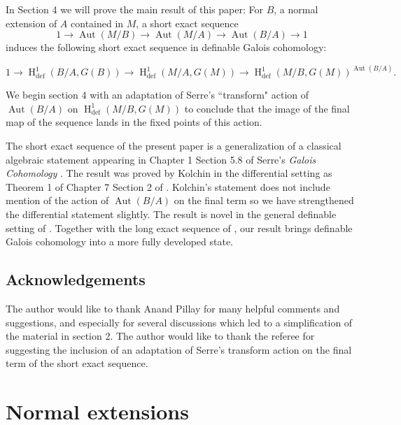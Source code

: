 \documentclass{article}
\theoremstyle{problemstyle}
\DeclareMathOperator{\defin}{def} %
\DeclareMathOperator{\aut}{Aut} %
\DeclareMathOperator{\HH}{H} %
\begin{document}
In Section 4 we will prove the main result of this paper: For $B$, a normal extension of $A$ contained in $M$, a short exact sequence $$1 \to \aut(M/B) \to \aut(M/A) \to \aut(B/A) \to 1$$ induces the following short exact sequence in definable Galois cohomology:

\vspace{-4mm}

\[1 \to \HH^1_{\defin}(B/A,G(B)) \to \HH^1_{\defin}(M/A,G(M)) \to \HH^1_{\defin}(M/B,G(M))^{\aut(B/A)}.\] 

We begin section 4 with an adaptation of Serre's ``transform" action of $\aut(B/A)$ on $\HH^1_{\defin}(M/B,G(M))$ to conclude that the image of the final map of the sequence lands in the fixed points of this action.

The short exact sequence of the present paper is a generalization of a classical algebraic statement appearing in Chapter 1 Section 5.8 of Serre's \textit{Galois Cohomology} \cite{serre1979galois}. The result was proved by Kolchin in the differential setting as Theorem 1 of Chapter 7 Section 2 of \cite{kolchin1985differential}. Kolchin's statement does not include mention of the action of $\aut(B/A)$ on the final term so we have strengthened the differential statement slightly. The result is novel in the general definable setting of \cite{pillay_1997}. Together with the long exact sequence of \cite{OmarAnandDavid}, our result brings definable Galois cohomology into a more fully developed state.  


\subsection*{Acknowledgements}

The author would like to thank Anand Pillay for many helpful comments and suggestions, and especially for several discussions which led to a simplification of the material in section 2. The author would like to thank the referee for suggesting the inclusion of an adaptation of Serre's transform action on the final term of the short exact sequence.  

\section{Normal extensions}
\end{document}
